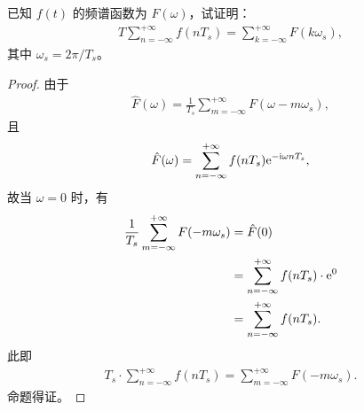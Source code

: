 \begin{homework}
    已知 $f(t)$ 的频谱函数为 $F(\omega)$，试证明：
    \begin{align*}
        T \sum_{n = -\infty}^{+\infty}f(nT_s) = \sum_{k = -\infty}^{+\infty}F(k\omega_s),
    \end{align*}
    其中 $\omega_s = 2\pi / T_s$。
\end{homework}

\begin{proof}
    由于
    \begin{align*}
        \hat{F}(\omega) = \frac{1}{T_s}\sum_{m = -\infty}^{+\infty}F(\omega - m\omega_s),
    \end{align*}
    且
    \begin{align*}
        \hat{F}(\omega) = \sum_{n = -\infty}^{+\infty}f(nT_s)\mathrm{e}^{-\mathrm{i}\omega nT_s},
    \end{align*}
    故当 $\omega = 0$ 时，有
    \begin{align*}
        \frac{1}{T_s}\sum_{m = -\infty}^{+\infty}F(-m\omega_s) & = \hat{F}(0) \\
        & = \sum_{n = -\infty}^{+\infty}f(nT_s) \cdot \mathrm{e}^{0} \\
        & = \sum_{n = -\infty}^{+\infty}f(nT_s).
    \end{align*}
    此即
    \begin{align*}
        T_s \cdot \sum_{n = -\infty}^{+\infty}f(nT_s) = \sum_{m = -\infty}^{+\infty}F(-m\omega_s).
    \end{align*}
    命题得证。
\end{proof}
